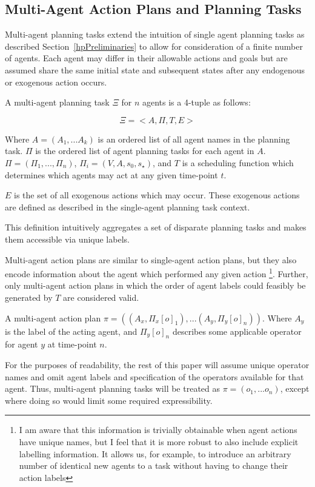 \documentclass{article}
\theoremstyle{plain}
\theoremstyle{definition}
\begin{document}
\subsection{Multi-Agent Action Plans and Planning Tasks} \label{sec:multiagentPlanning}
Multi-agent planning tasks extend the intuition of single agent planning tasks as described Section~\ref{hpPreliminaries} to allow for consideration of a finite number of agents. Each agent may differ in their allowable actions and goals but are assumed share the same initial state and subsequent states after any endogenous or exogenous action occurs.

A multi-agent planning task $\Xi$ for $n$ agents is a 4-tuple as follows:

\[
\Xi = <A, \Pi, T, E>
\]

 Where $A=(A_1,...A_k)$ is an ordered list of all agent names in the planning task. $\Pi$ is the ordered list of agent planning tasks for each agent in $A$. $\Pi=(\Pi_1,...,\Pi_n)$, $\Pi_i=(V,A,s_0,s_\star)$, and $T$ is a scheduling function which determines which agents may act at any given time-point $t$.
 
$E$ is the set of all exogenous actions which may occur. These exogenous actions are defined as described in the single-agent planning task context.
 
This definition intuitively aggregates a set of disparate planning tasks and makes them accessible via unique labels.

Multi-agent action plans are similar to single-agent action plans, but they also encode information about the agent which performed any given action \footnote{I am aware that this information is trivially obtainable when agent actions have unique names, but I feel that it is more robust to also include explicit labelling information. It allows us, for example, to introduce an arbitrary number of identical new agents to a task without having to change their action labels}. Further, only multi-agent action plans in which the order of agent labels could feasibly be generated by $T$ are considered valid.

A multi-agent action plan $\pi=((A_x, \Pi_x[o]_1),...(A_y, \Pi_y[o]_n))$. Where $A_y$ is the label of the acting agent, and $\Pi_y[o]_n$ describes some applicable operator for agent $y$ at time-point $n$.

For the purposes of readability, the rest of this paper will assume unique operator names and omit agent labels and specification of the operators available for that agent. Thus, multi-agent planning tasks will be treated as $\pi=(o_1,...o_n)$, except where doing so would limit some required expressibility. 
\end{document}
